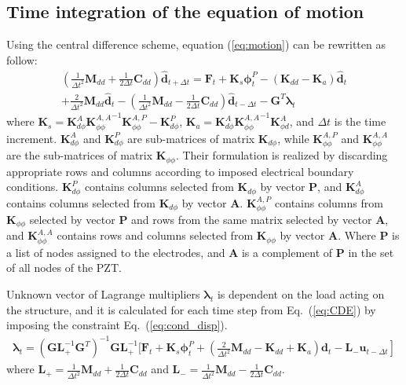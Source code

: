 \documentclass[materials,article,submit,moreauthors,pdftex]{Definitions/mdpi}
\begin{document}
\subsection{Time integration of the equation of motion}
\label{sec:time_integration}
Using the central difference scheme, equation (\ref{eq:motion}) can be rewritten as follow:
\begin{eqnarray}
\left(\frac{1}{\Delta t^2}\textbf{M}_{dd}+\frac{1}{2\Delta t}\textbf{C}_{dd} \right)\widehat{\textbf{d}}_{t+\Delta t}=
\textbf{F}_t+\textbf{K}_s\boldsymbol{\phi}_t^P-\left( \textbf{K}_{dd}-\textbf{K}_a\right)\widehat{\textbf{d}}_t\nonumber\\
+\frac{2}{\Delta t^2}\textbf{M}_{dd}\widehat{\textbf{d}}_t-\left(\frac{1}{\Delta t^2}\textbf{M}_{dd}-\frac{1}{2\Delta t}\textbf{C}_{dd}\right)\widehat{\textbf{d}}_{t-\Delta t}-\textbf{G}^T\boldsymbol{\lambda}_t
\label{eq:CDE}
\end{eqnarray}
where  \(\textbf{K}_s=\textbf{K}_{d\phi}^A{\textbf{K}_{\phi \phi}^{A,A}}^{-1}\textbf{K}_{\phi \phi}^{A,P}-\textbf{K}_{d\phi}^P\), \(\textbf{K}_a=\textbf{K}_{d \phi}^A{\textbf{K}_{\phi \phi}^{A,A}}^{-1}\textbf{K}_{\phi d}^A\), and \(\Delta t\) is the time increment.
\(\textbf{K}_{d \phi}^A\) and \(\textbf{K}_{d\phi}^P\) are sub-matrices of matrix \(\textbf{K}_{d\phi}\), while \(\textbf{K}_{\phi \phi}^{A,P}\) and \(\textbf{K}_{\phi \phi}^{A,A}\) are the sub-matrices of matrix \(\textbf{K}_{\phi \phi}\).
Their formulation is realized by discarding appropriate rows and columns according to imposed electrical boundary conditions.
\(\textbf{K}_{d \phi}^P\) contains columns selected from \(\textbf{K}_{d\phi}\) by vector \textbf{P}, and \(\textbf{K}_{d\phi}^A\) contains columns selected from \(\textbf{K}_{d\phi}\) by vector \textbf{A}.
\(\textbf{K}_{\phi \phi}^{A,P}\) contains columns from \(\textbf{K}_{\phi \phi}\) selected by vector \textbf{P} and rows from the same matrix selected by vector \textbf{A}, and \(\textbf{K}_{\phi \phi}^{A,A}\) contains rows and columns selected from \(\textbf{K}_{\phi \phi}\) by vector \textbf{A}.
Where \textbf{P} is a list of nodes assigned to the electrodes, and \textbf{A} is a complement of \textbf{P} in the set of all nodes of the PZT.

Unknown vector of Lagrange multipliers \(\boldsymbol{\lambda}_t\) is dependent on the load acting on the structure, and it is calculated for each time step from Eq.~(\ref{eq:CDE}) by imposing the constraint Eq.~(\ref{eq:cond_disp}).
\begin{eqnarray}
\boldsymbol{\lambda}_t = {\left(\textbf{G}\textbf{L}_+^{-1}\textbf{G}^T \right)}^{-1}\textbf{G}\textbf{L}_+^{-1} \Bigg[ \textbf{F}_t+\textbf{K}_s\boldsymbol{\phi}_t^P+\left.\left(\frac{2}{\Delta t^2}\textbf{M}_{dd}-\textbf{K}_{dd}+\textbf{K}_a\right)\textbf{d}_t -\textbf{L}_-\textbf{u}_{t-\Delta t} \right]
\end{eqnarray}
where \(\textbf{L}_+=\frac{1}{\Delta t^2}\textbf{M}_{dd}+\frac{1}{2\Delta t}\textbf{C}_{dd}\) and \(\textbf{L}_-=\frac{1}{\Delta t^2}\textbf{M}_{dd}-\frac{1}{2\Delta t}\textbf{C}_{dd}\).
\end{document}
